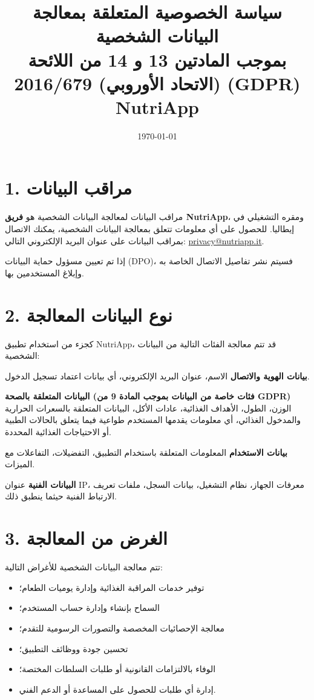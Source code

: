 \documentclass[a4paper,12pt]{article}
\title{\textbf{سياسة الخصوصية المتعلقة بمعالجة البيانات الشخصية}\\
بموجب المادتين 13 و 14 من اللائحة (الاتحاد الأوروبي) 2016/679 (GDPR)\\
NutriApp}
\date{\today}
\begin{document}
    \maketitle

    \section*{1. مراقب البيانات}

    مراقب البيانات لمعالجة البيانات الشخصية هو \textbf{فريق NutriApp}، ومقره التشغيلي في إيطاليا.
    للحصول على أي معلومات تتعلق بمعالجة البيانات الشخصية، يمكنك الاتصال بمراقب البيانات على عنوان البريد الإلكتروني التالي:
    \href{mailto:privacy@nutriapp.it}{privacy@nutriapp.it}.

    إذا تم تعيين مسؤول حماية البيانات (DPO)، فسيتم نشر تفاصيل الاتصال الخاصة به وإبلاغ المستخدمين بها.

    \section*{2. نوع البيانات المعالجة}

    كجزء من استخدام تطبيق NutriApp، قد تتم معالجة الفئات التالية من البيانات الشخصية:

    \textbf{بيانات الهوية والاتصال}
    الاسم، عنوان البريد الإلكتروني، أي بيانات اعتماد تسجيل الدخول.

    \textbf{البيانات المتعلقة بالصحة (فئات خاصة من البيانات بموجب المادة 9 من GDPR)}
    الوزن، الطول، الأهداف الغذائية، عادات الأكل، البيانات المتعلقة بالسعرات الحرارية والمدخول الغذائي، أي معلومات يقدمها المستخدم طواعية فيما يتعلق بالحالات الطبية أو الاحتياجات الغذائية المحددة.

    \textbf{بيانات الاستخدام}
    المعلومات المتعلقة باستخدام التطبيق، التفضيلات، التفاعلات مع الميزات.

    \textbf{البيانات الفنية}
    عنوان IP، معرفات الجهاز، نظام التشغيل، بيانات السجل، ملفات تعريف الارتباط الفنية حيثما ينطبق ذلك.

    \section*{3. الغرض من المعالجة}

    تتم معالجة البيانات الشخصية للأغراض التالية:

    \begin{itemize}
        \item توفير خدمات المراقبة الغذائية وإدارة يوميات الطعام؛
        \item السماح بإنشاء وإدارة حساب المستخدم؛
        \item معالجة الإحصائيات المخصصة والتصورات الرسومية للتقدم؛
        \item تحسين جودة ووظائف التطبيق؛
        \item الوفاء بالالتزامات القانونية أو طلبات السلطات المختصة؛
        \item إدارة أي طلبات للحصول على المساعدة أو الدعم الفني.
    \end{itemize}
\end{document}
